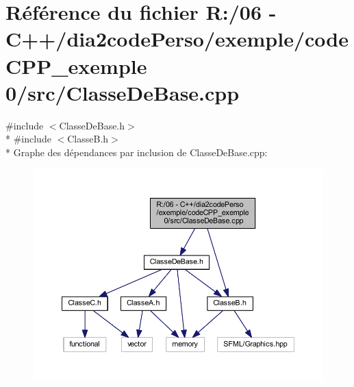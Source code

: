 \section{Référence du fichier R\+:/06 -\/ C++/dia2code\+Perso/exemple/code\+C\+P\+P\+\_\+exemple 0/src/\+Classe\+De\+Base.cpp}
\label{_classe_de_base_8cpp}
{\ttfamily \#include $<$Classe\+De\+Base.\+h$>$}\\*
{\ttfamily \#include $<$Classe\+B.\+h$>$}\\*
Graphe des dépendances par inclusion de Classe\+De\+Base.\+cpp\+:\nopagebreak
\begin{figure}[H]
\begin{center}
\leavevmode
\includegraphics[width=350pt]{_classe_de_base_8cpp__incl}
\end{center}
\end{figure}
